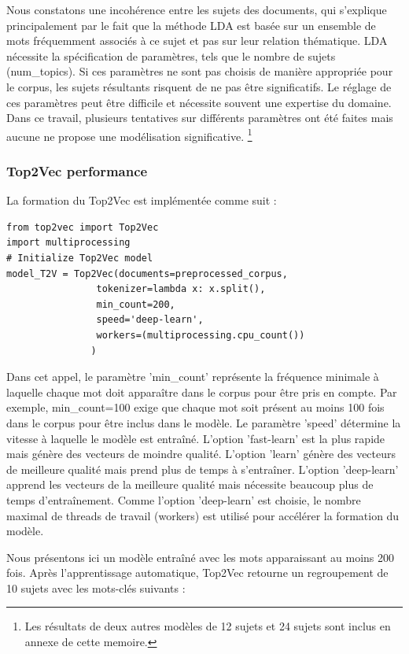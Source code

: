 Nous constatons une incohérence entre les sujets des documents, qui s'explique principalement par le fait que la méthode LDA est basée sur un ensemble de mots fréquemment associés à ce sujet et pas sur leur relation thématique. LDA nécessite la spécification de paramètres, tels que le nombre de sujets (num\_topics). Si ces paramètres ne sont pas choisis de manière appropriée pour le corpus, les sujets résultants risquent de ne pas être significatifs. Le réglage de ces paramètres peut être difficile et nécessite souvent une expertise du domaine.
Dans ce travail, plusieurs tentatives sur différents paramètres ont été faites mais aucune ne propose une modélisation significative.
\footnote{Les résultats de deux autres modèles de 12 sujets et 24 sujets sont inclus en annexe de cette memoire.}

\subsubsection{Top2Vec performance}
La formation du Top2Vec est implémentée comme suit :
\begin{lstlisting}
from top2vec import Top2Vec
import multiprocessing
# Initialize Top2Vec model
model_T2V = Top2Vec(documents=preprocessed_corpus, 
                tokenizer=lambda x: x.split(), 
                min_count=200,
                speed='deep-learn',
                workers=(multiprocessing.cpu_count())
               )
\end{lstlisting}
Dans cet appel, le paramètre 'min\_count' représente la fréquence minimale à laquelle chaque mot doit apparaître dans le corpus pour être pris en compte. Par exemple, min\_count=100 exige que chaque mot soit présent au moins 100 fois dans le corpus pour être inclus dans le modèle. Le paramètre 'speed' détermine la vitesse à laquelle le modèle est entraîné. L'option 'fast-learn' est la plus rapide mais génère des vecteurs de moindre qualité. L'option 'learn' génère des vecteurs de meilleure qualité mais prend plus de temps à s'entraîner. L'option 'deep-learn' apprend les vecteurs de la meilleure qualité mais nécessite beaucoup plus de temps d'entraînement. Comme l'option 'deep-learn' est choisie, le nombre maximal de threads de travail (workers) est utilisé pour accélérer la formation du modèle.

Nous présentons ici un modèle entraîné avec les mots apparaissant au moins 200 fois. Après l'apprentissage automatique, Top2Vec retourne un regroupement de 10 sujets avec les mots-clés suivants :

